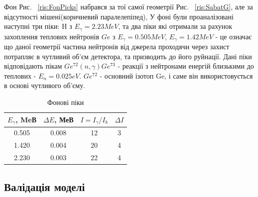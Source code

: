 \documentclass[a4paper, 14pt]{article}
\numberwithin{equation}{section}
\numberwithin{table}{section}
\begin{document}
	Фон Рис. ~\ref{ris:FonPicks} набрався за тої самої геометрії Рис. ~\ref{ris:SabatG}, але за відсутності мішені(коричневий паралелепіпед), У фоні були проаналізовані наступні три піки: H з $E_\gamma = 2.23 MeV$, та два піки які отримали за рахунок захоплення теплових нейтронів $Ge$ з $E_\gamma = 0.505MeV$, $E_\gamma = 1.42 MeV$ - це означає що даної геометрії частина нейтронів від джерела проходячи через захист потрапляє в чутливий об'єм детектора, та призводить до його руйнації. Дані піки відповідають пікам $Ge^{72}(n, \gamma)Ge^{73}$ - реакції з нейтронами енергій близькими до теплових - $E_n = 0.025eV$. $Ge^{72}$ - основний ізотоп Ge, і саме він використовується в основі чутливого об'єму.
	\begin{table}[h]
		\centering
		\begin{tabular}{|c|c|c|c|} 
			\hline
			$E_{\gamma}$, MeВ & $\Delta{E}$, МеВ & $I = I_{\gamma} / I_{b}$ & $\Delta{I}$\\
			\hline
			0.505 & 0.008 & 12 & 3 \\
			\hline
			1.420 & 0.004 & 20 & 4 \\	
			\hline
			2.230 & 0.003 & 22 & 4 \\	
			\hline
		\end{tabular}
		\caption{Фонові піки} 
		\label{tabl:ResultsBackground}
	\end{table}
	
	\subsection{Валідація моделі}
	
\end{document}
